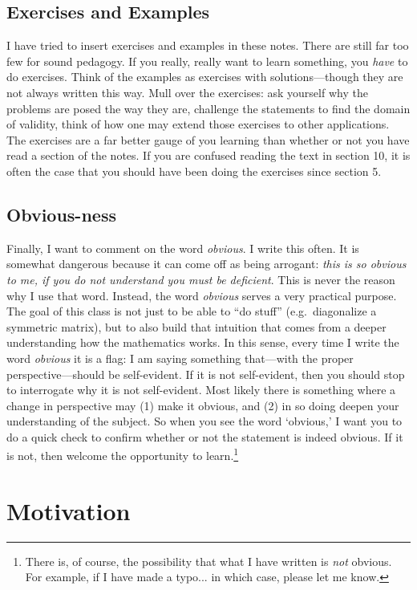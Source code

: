 \documentclass[12pt]{article}
\begin{document}
\subsection{Exercises and Examples}
I have tried to insert exercises and examples in these notes. There are still far too few for sound pedagogy. If you really, really want to learn something, you \emph{have} to do exercises. Think of the examples as exercises with solutions---though they are not always written this way. Mull over the exercises: ask yourself why the problems are posed the way they are, challenge the statements to find the domain of validity, think of how one may extend those exercises to other applications. The exercises are a far better gauge of you learning than whether or not you have read a section of the notes. If you are confused reading the text in section 10, it is often the case that you should have been doing the exercises since section 5.


\subsection{Obvious-ness}
Finally, I want to comment on the word \emph{obvious}. I write this often. It is somewhat dangerous because it can come off as being arrogant: \emph{this is so obvious to me, if you do not understand you must be deficient}. This is never the reason why I use that word. Instead, the word \emph{obvious} serves a very practical purpose. The goal of this class is not just to be able to ``do stuff'' (e.g.~diagonalize a symmetric matrix), but to also build that intuition that comes from a deeper understanding how the mathematics works. In this sense, every time I write the word \emph{obvious} it is a flag: I am saying something that---with the proper perspective---should be self-evident. If it is not self-evident, then you should stop to interrogate why it is not self-evident. Most likely there is something where a change in perspective may (1) make it obvious, and (2) in so doing deepen your understanding of the subject. So when you see the word `obvious,' I want you to do a quick check to confirm whether or not the statement is indeed obvious. If it is not, then welcome the opportunity to learn.\footnote{There is, of course, the possibility that what I have written is \emph{not} obvious. For example, if I have made a typo... in which case, please let me know.}

\section{Motivation}
\end{document}
